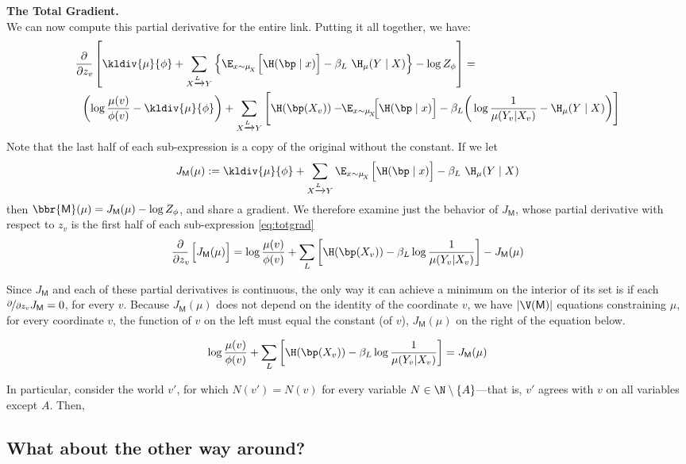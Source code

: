 \documentclass{article}
\newcommand{\sfM}{\mathsf M}
\newcommand{\alle}[1][L]{_{ X \xrightarrow{\!\!#1} Y }}
\begin{document}
	\textbf{The Total Gradient.}\\
	We can now compute this partial derivative for the entire link. Putting it all together, we have:
	\begin{equation}
	\begin{aligned}
		\pz{\kldiv{\mu}{\phi} + \sum\alle\left\{ \E_{x \sim \mu_{\!_X}} \Big[ \H(\bp \mid x)\Big] - \beta_L \ \H_\mu(Y \mid X)\right\}  - \log Z_\phi }
			&= \\
			\left(\log\frac{\mu(v)}{\phi(v)} - \kldiv{\mu}{\phi} \right) + \sum\alle\Bigg[ \H(\bp(X_v)) - \!\! \E_{x \sim \mu_{\!_X}}\!\! \Big[ \H(\bp \mid x)\Big]  - \beta_L & \bigg(\log \frac{1}{\mu(Y_v | X_v)} - \H_\mu(Y \mid X) \bigg) \Bigg]
	\end{aligned}\label{eq:totgrad}
	\end{equation}
	Note that the last half of each sub-expression is a copy of the original without the constant. If we let
	\[ J_\sfM(\mu) := \kldiv{\mu}{\phi} + \sum\alle \E_{x \sim \mu_{\!_X}} \Big[ \H(\bp \mid x)\Big] - \beta_L \ \H_\mu(Y \mid X) \]
	then $\bbr{\sfM}(\mu) = J_\sfM(\mu) - \log Z_\phi$, and share a gradient. We therefore examine just the behavior of $J_\sfM$, whose partial derivative with respect to $z_v$ is the first half of each sub-expression \eqref{eq:totgrad}
	\[ \pz{J_\sfM(\mu)} = \log\frac{\mu(v)}{\phi(v)} + \sum_L\left[ \H(\bp(X_v)) - \beta_L \log \frac{1}{\mu(Y_v | X_v)} \right] - J_\sfM(\mu) \]


	Since $J_\sfM$ and each of these partial derivatives is continuous, the only way it can achieve a minimum on the interior of its set is if each $\nicefrac{\partial}{\partial z_v} J_\sfM = 0$, for every $v$. Because $J_\sfM(\mu)$ does not depend on the identity of the coordinate $v$, we have $|\V(\sfM)|$ equations constraining $\mu$, for every coordinate $v$, the function of $v$ on the left must equal the constant (of $v$), $J_\sfM(\mu)$ on the right of the equation below.

	\[  \log\frac{\mu(v)}{\phi(v)} + \sum_L\left[ \H(\bp(X_v)) - \beta_L \log \frac{1}{\mu(Y_v | X_v)} \right] = J_\sfM(\mu) \]

	In particular, consider the world $v'$, for which $N(v') = N(v)$ for every variable $N \in \N \setminus \{A\}$---that is, $v'$ agrees with $v$ on all variables except $A$. Then,

	\endgroup
	\subsection{What about the other way around?}
\end{document}
